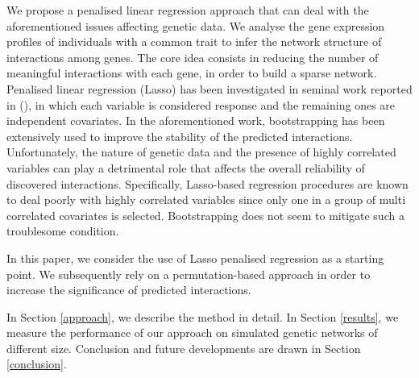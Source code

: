 We propose a penalised linear regression approach that can deal with the aforementioned issues affecting genetic data. We analyse the gene expression profiles of individuals with a common trait to infer the network structure of interactions among genes. The core idea consists in reducing the number of meaningful interactions with each gene, in order to build a sparse network. Penalised linear regression (Lasso) has been investigated in seminal work reported in (\citealp{Tibshirani94regressionshrinkage, Meinshausen06highdimensional, finegold, Meinshausen_stabilityselection}), in which each variable is considered response and the remaining ones are independent covariates. In the aforementioned work, bootstrapping has been extensively used to improve the stability of the predicted interactions. Unfortunately, the nature of genetic data and the presence of highly correlated variables can play a detrimental role that affects the overall reliability of discovered interactions. Specifically, Lasso-based regression procedures are known to deal poorly with highly correlated variables since only one in a group of multi correlated covariates is selected. Bootstrapping does not seem to mitigate such a troublesome condition.

In this paper, we consider the use of Lasso penalised regression as a starting point. We subsequently rely on a permutation-based approach in order to increase the significance of predicted interactions. 

In Section \ref{approach}, we describe the method in detail. In Section \ref{results}, we measure the performance of our approach on simulated genetic networks of different size. Conclusion and future developments are drawn in Section \ref{conclusion}.




